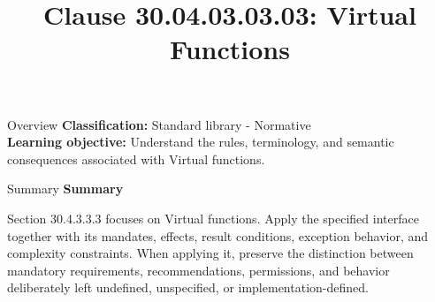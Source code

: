 \documentclass[10pt,letterpaper]{article}
\title{Clause 30.04.03.03.03: Virtual Functions}
\author{}
\date{}
\begin{document}
\maketitle
\begin{CornellOverviewBox}{Overview}
\textbf{Classification:} Standard library - Normative\\[2pt]
\textbf{Learning objective:} Understand the rules, terminology, and semantic consequences associated with Virtual functions.
\end{CornellOverviewBox}\begin{CornellSummaryBox}{Summary}
{\sffamily\bfseries\color{Accent} Summary}\par\vspace{3pt}Section 30.4.3.3.3 focuses on Virtual functions. Apply the specified interface together with its mandates, effects, result conditions, exception behavior, and complexity constraints. When applying it, preserve the distinction between mandatory requirements, recommendations, permissions, and behavior deliberately left undefined, unspecified, or implementation-defined.
\end{CornellSummaryBox}
\end{document}
